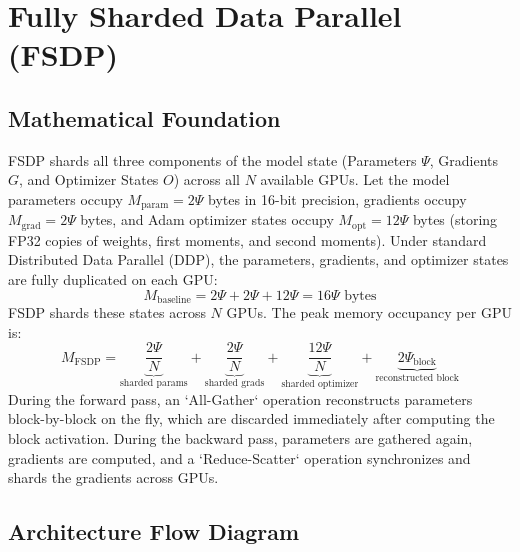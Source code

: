 \newpage
\section{Fully Sharded Data Parallel (FSDP)}

\subsection{Mathematical Foundation}
FSDP shards all three components of the model state (Parameters $\Psi$, Gradients $G$, and Optimizer States $O$) across all $N$ available GPUs.
Let the model parameters occupy $M_{\text{param}} = 2\Psi$ bytes in 16-bit precision, gradients occupy $M_{\text{grad}} = 2\Psi$ bytes, and Adam optimizer states occupy $M_{\text{opt}} = 12\Psi$ bytes (storing FP32 copies of weights, first moments, and second moments).
Under standard Distributed Data Parallel (DDP), the parameters, gradients, and optimizer states are fully duplicated on each GPU:
\begin{equation}
  M_{\text{baseline}} = 2\Psi + 2\Psi + 12\Psi = 16\Psi \text{ bytes}
\end{equation}
FSDP shards these states across $N$ GPUs. The peak memory occupancy per GPU is:
\begin{equation}
  M_{\text{FSDP}} = \underbrace{\frac{2\Psi}{N}}_{\text{sharded params}} + \underbrace{\frac{2\Psi}{N}}_{\text{sharded grads}} + \underbrace{\frac{12\Psi}{N}}_{\text{sharded optimizer}} + \underbrace{2\Psi_{\text{block}}}_{\text{reconstructed block}}
\end{equation}
During the forward pass, an `All-Gather` operation reconstructs parameters block-by-block on the fly, which are discarded immediately after computing the block activation. During the backward pass, parameters are gathered again, gradients are computed, and a `Reduce-Scatter` operation synchronizes and shards the gradients across GPUs.

\subsection{Architecture Flow Diagram}

